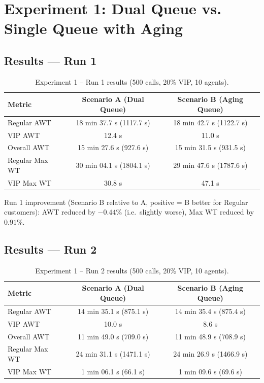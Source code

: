 \documentclass[11pt]{article}
\begin{document}
\section{Experiment 1: Dual Queue vs. Single Queue with Aging}

\subsection{Results --- Run 1}
\begin{table}[htbp]
\centering
\small
\begin{tabular}{lcc}
\toprule
\textbf{Metric} & \textbf{Scenario A (Dual Queue)} & \textbf{Scenario B (Aging Queue)} \\
\midrule
Regular AWT & 18 min 37.7 s (1117.7 s) & 18 min 42.7 s (1122.7 s) \\
VIP AWT & 12.4 s & 11.0 s \\
Overall AWT & 15 min 27.6 s (927.6 s) & 15 min 31.5 s (931.5 s) \\
Regular Max WT & 30 min 04.1 s (1804.1 s) & 29 min 47.6 s (1787.6 s) \\
VIP Max WT & 30.8 s & 47.1 s \\
\bottomrule
\end{tabular}
\caption{Experiment 1 -- Run 1 results (500 calls, 20\% VIP, 10 agents).}
\end{table}

Run 1 improvement (Scenario B relative to A, positive = B better for Regular customers): AWT reduced by $-0.44\%$ (i.e.\ slightly worse), Max WT reduced by $0.91\%$.

\subsection{Results --- Run 2}
\begin{table}[htbp]
\centering
\small
\begin{tabular}{lcc}
\toprule
\textbf{Metric} & \textbf{Scenario A (Dual Queue)} & \textbf{Scenario B (Aging Queue)} \\
\midrule
Regular AWT & 14 min 35.1 s (875.1 s) & 14 min 35.4 s (875.4 s) \\
VIP AWT & 10.0 s & 8.6 s \\
Overall AWT & 11 min 49.0 s (709.0 s) & 11 min 48.9 s (708.9 s) \\
Regular Max WT & 24 min 31.1 s (1471.1 s) & 24 min 26.9 s (1466.9 s) \\
VIP Max WT & 1 min 06.1 s (66.1 s) & 1 min 09.6 s (69.6 s) \\
\bottomrule
\end{tabular}
\caption{Experiment 1 -- Run 2 results (500 calls, 20\% VIP, 10 agents).}
\end{table}
\end{document}
